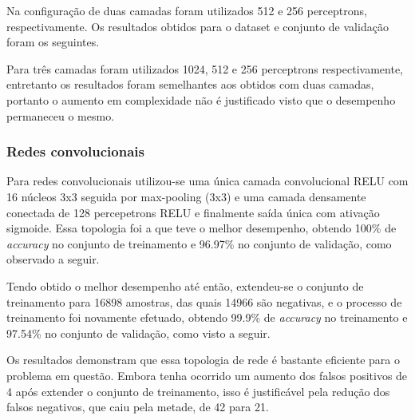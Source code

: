 Na configuração de duas camadas foram utilizados 512 e 256 perceptrons, respectivamente. Os resultados obtidos para o dataset e conjunto de validação foram os seguintes.
\begin{table}[h!]

\end{table}

Para três camadas foram utilizados 1024, 512 e 256 perceptrons respectivamente, entretanto os resultados foram semelhantes aos obtidos com duas camadas, portanto o aumento em complexidade não é justificado visto que o desempenho permaneceu o mesmo.

\subsubsection{Redes convolucionais}
Para redes convolucionais utilizou-se uma única camada convolucional RELU com 16 núcleos 3x3 seguida por max-pooling (3x3) e uma camada densamente conectada de 128 percepetrons RELU e finalmente saída única com ativação sigmoide. Essa topologia foi a que teve o melhor desempenho, obtendo 100\% de \textit{accuracy} no conjunto de treinamento e 96.97\% no conjunto de validação, como observado a seguir.

\begin{table}[h!]
\end{table}

Tendo obtido o melhor desempenho até então, extendeu-se o conjunto de treinamento para 16898 amostras, das quais 14966 são negativas, e o processo de treinamento foi novamente efetuado, obtendo 99.9\% de \textit{accuracy} no treinamento e 97.54\% no conjunto de validação, como visto a seguir.

\begin{table}[h!]
\end{table}

Os resultados demonstram que essa topologia de rede é bastante eficiente para o problema em questão. Embora tenha ocorrido um aumento dos falsos positivos de 4 após extender o conjunto de treinamento, isso é justificável pela redução dos falsos negativos, que caiu pela metade, de 42 para 21.


